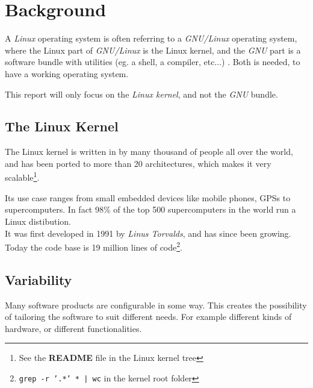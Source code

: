 \documentclass[a4paper,11pt]{report}
\newcommand{\textcode}[1]{
    \fboxsep=1pt
    \texttt{\colorbox{gray!20}{#1}}
}
\begin{document}

\newpage
        \chapter{Background}

A \emph{Linux} operating system is often referring to a \emph{GNU/Linux} 
operating system, where the Linux part of \emph{GNU/Linux} is the Linux kernel, 
and the \emph{GNU} part is a software bundle with utilities (eg. a shell, a 
compiler, etc...) \cite{gnupack}. Both is 
needed, to have a working operating system. 

This report will only focus on the \emph{Linux kernel}, and not the \emph{GNU} 
bundle.


        \section{The Linux Kernel}
The Linux kernel is written in by many thousand of people all over 
the world, and has been ported to more than 20 architectures, which makes it 
very scalable\footnote
    {See the \textbf{README} file in the Linux kernel tree}.

Its use case ranges from small embedded devices like mobile phones, GPSs to 
supercomputers. In fact 98\% of the top 500 supercomputers in the world run a Linux 
distibution\cite
    {top500}.
\\

It was first developed in 1991 by \emph{Linus Torvalds}, and has since been 
growing. Today the code base is 19 million lines of code\footnote
    {\textcode{grep -r '.*' * | wc} in the kernel root folder}.


        \section{Variability}
Many software products are configurable in some way. This creates the 
possibility of tailoring the software to suit different needs. For example 
different kinds of hardware, or different functionalities. 
\\
\end{document}
